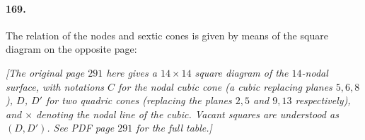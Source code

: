 \documentclass[11pt,a4paper]{article}
\begin{document}
\paragraph{169.}
The relation of the nodes and sextic cones is given by means of the
square diagram on the opposite page:

\bigskip

\begin{center}
\textit{[The original page $291$ here gives a $14 \times 14$ square
diagram of the $14$-nodal surface, with notations $C$ for the nodal cubic
cone (a cubic replacing planes $5, 6, 8$), $D$, $D'$ for two quadric
cones (replacing the planes $2, 5$ and $9, 13$ respectively), and $\times$
denoting the nodal line of the cubic. Vacant squares are understood as
$(D, D')$. See PDF page $291$ for the full table.]}
\end{center}

\bigskip
\end{document}

